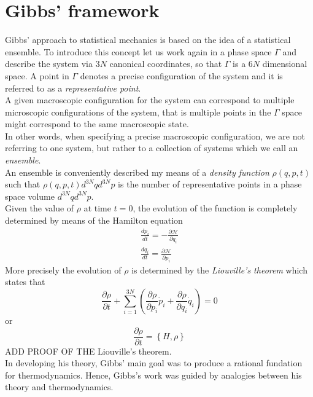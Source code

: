 \section{Gibbs' framework}
Gibbs' approach to statistical mechanics is based on the idea of a statistical ensemble. To introduce this concept
let us work again in a phase space $\Gamma$ and describe the system via $3N$ canonical coordinates, so that $\Gamma$ is a $6N$ dimensional space. A point in $\Gamma$ denotes
a precise configuration of the system and it is referred to as a \emph{representative point}. \\
A given macroscopic configuration for the system can correspond to multiple microscopic configurations of the system, that is multiple points in the $\Gamma$ space might correspond to the same macroscopic state. \\
In other words, when specifying a precise macroscopic configuration, we are not referring to one system, but rather to a collection of systems which we call an \emph{ensemble}. \\
An ensemble is conveniently described my means of a \emph{density function} $\rho(q, p ,t)$ such that $\rho(q, p, t) d^{3N}qd^{3N}p$ is the number of representative points in a phase space volume $d^{3N}qd^{3N}p$. \\
Given the value of $\rho$ at time $t=0$, the evolution of the function is completely determined by means of the Hamilton equation 
\begin{gather*}
    \frac{dp_i}{dt} = -\frac{\partial \mathcal H}{\partial q_i} \\
    \frac{dq_i}{dt} = \frac{\partial \mathcal H}{\partial p_i}
\end{gather*}
More precisely the evolution of $\rho$ is determined by the \emph{Liouville's theorem} which states that
\begin{equation}
    \frac{\partial \rho}{\partial t} + \sum_{i=1}^{3N} \left(\frac{\partial \rho}{\partial p_i}\dot p_i + \frac{\partial \rho}{\partial q_i} \dot q_i\right) = 0
\end{equation}
or 
\begin{equation*}
    \frac{\partial \rho}{\partial t} = \left\{H, \rho\right\}
\end{equation*}
ADD PROOF OF THE Liouville's theorem. \\
\vspace{10pt}
In developing his theory, Gibbs' main goal was to produce a rational fundation for thermodynamics. Hence, Gibbs's work was guided by analogies between his theory and thermodynamics. \\
